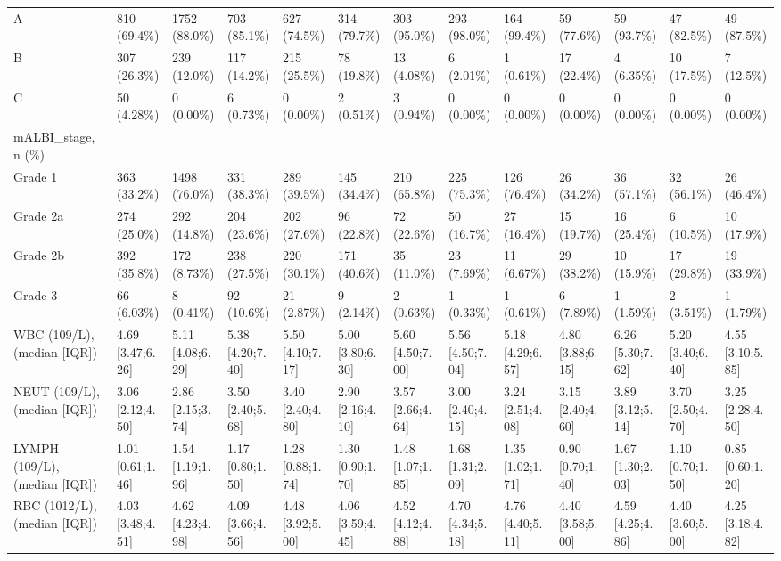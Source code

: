 \begin{landscape}
\begin{center}
\begin{longtable}{p{5.2cm}p{3.0cm}}
A & 810 (69.4\%) & 1752 (88.0\%) & 703 (85.1\%) & 627 (74.5\%) & 314 (79.7\%) & 303 (95.0\%) & 293 (98.0\%) & 164 (99.4\%) & 59 (77.6\%) & 59 (93.7\%) & 47 (82.5\%) & 49 (87.5\%) \\
B & 307 (26.3\%) & 239 (12.0\%) & 117 (14.2\%) & 215 (25.5\%) & 78 (19.8\%) & 13 (4.08\%) & 6 (2.01\%) & 1 (0.61\%) & 17 (22.4\%) & 4 (6.35\%) & 10 (17.5\%) & 7 (12.5\%) \\
C & 50 (4.28\%) & 0 (0.00\%) & 6 (0.73\%) & 0 (0.00\%) & 2 (0.51\%) & 3 (0.94\%) & 0 (0.00\%) & 0 (0.00\%) & 0 (0.00\%) & 0 (0.00\%) & 0 (0.00\%) & 0 (0.00\%) \\
mALBI\_stage, n (\%) &  &  &  &  &  &  &  &  &  &  &  &  \\
Grade 1 & 363 (33.2\%) & 1498 (76.0\%) & 331 (38.3\%) & 289 (39.5\%) & 145 (34.4\%) & 210 (65.8\%) & 225 (75.3\%) & 126 (76.4\%) & 26 (34.2\%) & 36 (57.1\%) & 32 (56.1\%) & 26 (46.4\%) \\
Grade 2a & 274 (25.0\%) & 292 (14.8\%) & 204 (23.6\%) & 202 (27.6\%) & 96 (22.8\%) & 72 (22.6\%) & 50 (16.7\%) & 27 (16.4\%) & 15 (19.7\%) & 16 (25.4\%) & 6 (10.5\%) & 10 (17.9\%) \\
Grade 2b & 392 (35.8\%) & 172 (8.73\%) & 238 (27.5\%) & 220 (30.1\%) & 171 (40.6\%) & 35 (11.0\%) & 23 (7.69\%) & 11 (6.67\%) & 29 (38.2\%) & 10 (15.9\%) & 17 (29.8\%) & 19 (33.9\%) \\
Grade 3 & 66 (6.03\%) & 8 (0.41\%) & 92 (10.6\%) & 21 (2.87\%) & 9 (2.14\%) & 2 (0.63\%) & 1 (0.33\%) & 1 (0.61\%) & 6 (7.89\%) & 1 (1.59\%) & 2 (3.51\%) & 1 (1.79\%) \\
WBC (109/L), (median [IQR]) & 4.69 [3.47;6.26] & 5.11 [4.08;6.29] & 5.38 [4.20;7.40] & 5.50 [4.10;7.17] & 5.00 [3.80;6.30] & 5.60 [4.50;7.00] & 5.56 [4.50;7.04] & 5.18 [4.29;6.57] & 4.80 [3.88;6.15] & 6.26 [5.30;7.62] & 5.20 [3.40;6.40] & 4.55 [3.10;5.85] \\
NEUT (109/L), (median [IQR]) & 3.06 [2.12;4.50] & 2.86 [2.15;3.74] & 3.50 [2.40;5.68] & 3.40 [2.40;4.80] & 2.90 [2.16;4.10] & 3.57 [2.66;4.64] & 3.00 [2.40;4.15] & 3.24 [2.51;4.08] & 3.15 [2.40;4.60] & 3.89 [3.12;5.14] & 3.70 [2.50;4.70] & 3.25 [2.28;4.50] \\
LYMPH (109/L), (median [IQR]) & 1.01 [0.61;1.46] & 1.54 [1.19;1.96] & 1.17 [0.80;1.50] & 1.28 [0.88;1.74] & 1.30 [0.90;1.70] & 1.48 [1.07;1.85] & 1.68 [1.31;2.09] & 1.35 [1.02;1.71] & 0.90 [0.70;1.40] & 1.67 [1.30;2.03] & 1.10 [0.70;1.50] & 0.85 [0.60;1.20] \\
RBC (1012/L), (median [IQR]) & 4.03 [3.48;4.51] & 4.62 [4.23;4.98] & 4.09 [3.66;4.56] & 4.48 [3.92;5.00] & 4.06 [3.59;4.45] & 4.52 [4.12;4.88] & 4.70 [4.34;5.18] & 4.76 [4.40;5.11] & 4.40 [3.58;5.00] & 4.59 [4.25;4.86] & 4.40 [3.60;5.00] & 4.25 [3.18;4.82] \\

\end{longtable}
\end{center}
\end{landscape}
